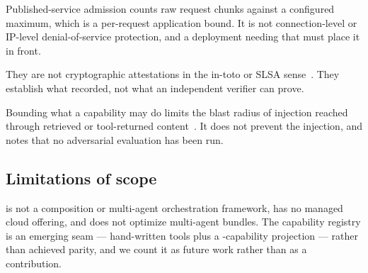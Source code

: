  Published-service admission counts raw
request chunks against a configured maximum, which is a per-request application
bound. It is not connection-level or IP-level denial-of-service protection, and a
deployment needing that must place it in front.

 They are not cryptographic
attestations in the in-toto or SLSA sense~\cite{torresarias2019intoto,slsa}. They
establish what \sys recorded, not what an independent verifier can prove.

 Bounding what a capability may do
limits the blast radius of injection reached through retrieved or tool-returned
content~\cite{greshake2023injection,perez2022ignore}. It does not prevent the
injection, and  notes that no adversarial evaluation has been run.

\subsection{Limitations of scope}

\sys is not a composition or multi-agent orchestration framework, has no managed
cloud offering, and does not optimize multi-agent bundles. The \aria{} capability
registry is an emerging seam --- \statAriaTools{} hand-written tools plus a
\statAriaProjected{}-capability projection --- rather than achieved parity, and we
count it as future work rather than as a contribution.
